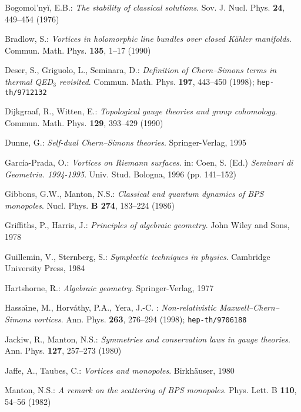 \documentclass[a4paper,11pt]{article}
\begin{document}
\begin{thebibliography}{99}

\begin{small}

{\sc Bogomol'ny\u i, E.B.}: {\it The stability of classical solutions}.
Sov. J. Nucl. Phys. {\bf 24}, 449--454 (1976)

{\sc Bradlow, S.}: {\it Vortices in holomorphic line bundles over
closed K\"ahler manifolds}. Commun. Math. Phys. {\bf 135}, 1--17 (1990)

{\sc Deser, S.}, {\sc Griguolo, L.}, {\sc Seminara, D.}: 
{\it Definition of Chern--Simons terms in thermal QED$_{3}$ revisited}.
Commun. Math. Phys. {\bf 197}, 443--450 (1998); {\tt hep-th/9712132}

{\sc Dijkgraaf, R.}, {\sc Witten, E.}: {\it Topological gauge theories
and group cohomology}. Commun. Math. Phys. {\bf 129}, 393--429 (1990)

{\sc Dunne, G.}: {\it Self-dual Chern--Simons theories}. 
Springer-Verlag, 1995

{\sc Garc\'ia-Prada, O.}: {\it Vortices on Riemann surfaces}. 
in: {\sc Coen, S.} (Ed.) {\it Seminari di Geometria. 1994-1995}. Univ.
Stud. Bologna, 1996 (pp. 141--152)

{\sc Gibbons, G.W.}, {\sc Manton, N.S.}: {\it Classical and quantum
dynamics of BPS monopoles}. Nucl. Phys. {\bf B 274}, 183--224 (1986)

{\sc Griffiths, P.}, {\sc Harris, J.}: {\it Principles of algebraic
geometry}. John Wiley and Sons, 1978

{\sc Guillemin, V.}, {\sc Sternberg, S.}: {\it Symplectic techniques
in physics}. Cambridge University Press, 1984

{\sc Hartshorne, R.}: {\it Algebraic geometry}. Springer-Verlag, 1977

{\sc Hassa\"\i ne, M.}, {\sc Horv\'athy, P.A.},
{\sc Yera, J.-C.} : {\it Non-relativistic Maxwell--Chern--Simons
vortices}. Ann. Phys. {\bf 263}, 276--294 (1998); {\tt hep-th/9706188}

{\sc Jackiw, R.}, {\sc Manton, N.S.}: {\it Symmetries and
conservation laws in gauge theories}. Ann. Phys. {\bf 127}, 257--273 (1980)

{\sc Jaffe, A.}, {\sc Taubes, C.}: {\it Vortices and monopoles}. 
Birkh\"auser, 1980

{\sc Manton, N.S.}: {\it A remark on the scattering of BPS monopoles}. 
Phys. Lett. B {\bf 110}, 54--56 (1982)


\end{small}
\end{thebibliography}
\end{document}
